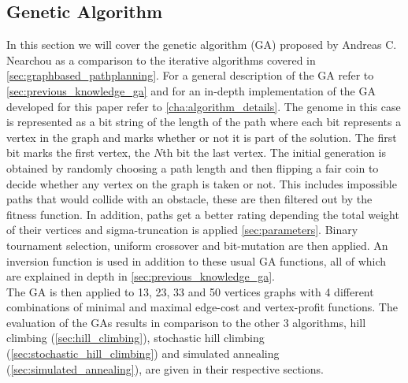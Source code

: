 

\subsection{Genetic Algorithm}
\label{sec:other_genetic_algorithm}

In this section we will cover the genetic algorithm (GA) proposed by Andreas C. Nearchou \cite{8} as a comparison to the iterative algorithms covered in \ref{sec:graphbased_pathplanning}. For a general description of the GA refer to \ref{sec:previous_knowledge_ga} and for an in-depth implementation of the GA developed for this paper refer to \ref{cha:algorithm_details}.
The genome in this case is represented as a bit string of the length of the path where each bit represents a vertex in the graph and marks whether or not it is part of the solution. The first bit marks the first vertex, the $N$th bit the last vertex. The initial generation is obtained by randomly choosing a path length and then flipping a fair coin to decide whether any vertex on the graph is taken or not. This includes impossible paths that would collide with an obstacle, these are then filtered out by the fitness function. In addition, paths get a better rating depending the total weight of their vertices and sigma-truncation is applied \ref{sec:parameters}. Binary tournament selection, uniform crossover and bit-mutation are then applied. An inversion function is used in addition to these usual GA functions, all of which are explained in depth in \ref{sec:previous_knowledge_ga}.\\
The GA is then applied to 13, 23, 33 and 50 vertices graphs with 4 different combinations of minimal and maximal edge-cost and vertex-profit functions. The evaluation of the GAs results in comparison to the other 3 algorithms, hill climbing (\ref{sec:hill_climbing}), stochastic hill climbing (\ref{sec:stochastic_hill_climbing}) and simulated annealing (\ref{sec:simulated_annealing}), are given in their respective sections.